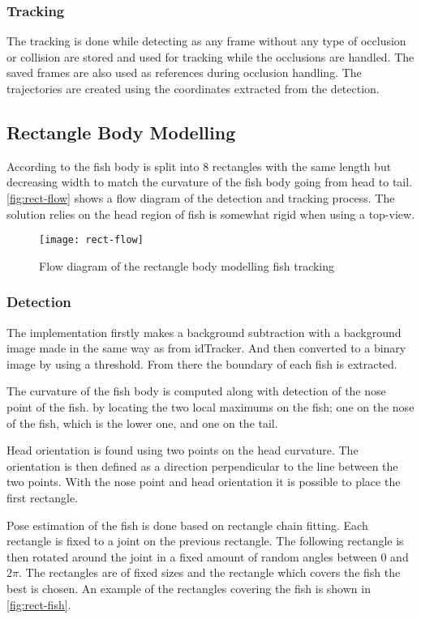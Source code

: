 \subsubsection{Tracking}
The tracking is done while detecting as any frame without any type of occlusion or collision are stored and used for tracking while the occlusions are handled. The saved frames are also used as references during occlusion handling. The trajectories are created using the coordinates extracted from the detection.

\subsection{Rectangle Body Modelling}
According to \cite{HongWang2016} the fish body is split into 8 rectangles with the same length but decreasing width to match the curvature of the fish body going from head to tail. \autoref{fig:rect-flow} shows a flow diagram of the detection and tracking process. The solution relies on the head region of fish is somewhat rigid when using a top-view.

\begin{figure}[H]
	\centering
	\texttt{[image: rect-flow]}
	\caption{Flow diagram of the rectangle body modelling fish tracking \citep{HongWang2016}}
	\label{fig:rect-flow}
\end{figure}

\subsubsection{Detection}
The implementation firstly makes a background subtraction with a background image made in the same way as from idTracker. And then converted to a binary image by using a threshold. From there the boundary of each fish is extracted.

The curvature of the fish body is computed along with detection of the nose point of the fish. by locating the two local maximums on the fish; one on the nose of the fish, which is the lower one, and one on the tail.

Head orientation is found using two points on the head curvature. The orientation is then defined as a direction perpendicular to the line between the two points. With the nose point and head orientation it is possible to place the first rectangle.

Pose estimation of the fish is done based on rectangle chain fitting. Each rectangle is fixed to a joint on the previous rectangle. The following rectangle is then rotated around the joint in a fixed amount of random angles between $0$ and $2\pi$. The rectangles are of fixed sizes and the rectangle which covers the fish the best is chosen. An example of the rectangles covering the fish is shown in \autoref{fig:rect-fish}.

